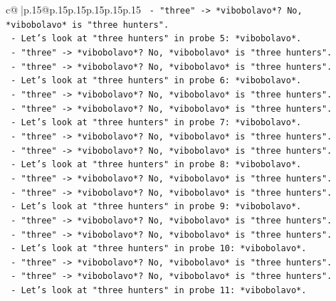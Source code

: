 \documentclass{article}
\begin{document}
{\begin{supertabular}{c@{$\;$}|p{.15\linewidth}@{}p{.15\linewidth}p{.15\linewidth}p{.15\linewidth}p{.15\linewidth}p{.15\linewidth}}
{{{\texttt{                  {-} "three" {-}> *vibobolavo*? No, *vibobolavo* is "three hunters".} \\
\texttt{                  {-} Let's look at "three hunters" in probe 5: *vibobolavo*.} \\
\texttt{                  {-} "three" {-}> *vibobolavo*? No, *vibobolavo* is "three hunters".} \\
\texttt{                  {-} "three" {-}> *vibobolavo*? No, *vibobolavo* is "three hunters".} \\
\texttt{                  {-} Let's look at "three hunters" in probe 6: *vibobolavo*.} \\
\texttt{                  {-} "three" {-}> *vibobolavo*? No, *vibobolavo* is "three hunters".} \\
\texttt{                  {-} "three" {-}> *vibobolavo*? No, *vibobolavo* is "three hunters".} \\
\texttt{                  {-} Let's look at "three hunters" in probe 7: *vibobolavo*.} \\
\texttt{                  {-} "three" {-}> *vibobolavo*? No, *vibobolavo* is "three hunters".} \\
\texttt{                  {-} "three" {-}> *vibobolavo*? No, *vibobolavo* is "three hunters".} \\
\texttt{                  {-} Let's look at "three hunters" in probe 8: *vibobolavo*.} \\
\texttt{                  {-} "three" {-}> *vibobolavo*? No, *vibobolavo* is "three hunters".} \\
\texttt{                  {-} "three" {-}> *vibobolavo*? No, *vibobolavo* is "three hunters".} \\
\texttt{                  {-} Let's look at "three hunters" in probe 9: *vibobolavo*.} \\
\texttt{                  {-} "three" {-}> *vibobolavo*? No, *vibobolavo* is "three hunters".} \\
\texttt{                  {-} "three" {-}> *vibobolavo*? No, *vibobolavo* is "three hunters".} \\
\texttt{                  {-} Let's look at "three hunters" in probe 10: *vibobolavo*.} \\
\texttt{                  {-} "three" {-}> *vibobolavo*? No, *vibobolavo* is "three hunters".} \\
\texttt{                  {-} "three" {-}> *vibobolavo*? No, *vibobolavo* is "three hunters".} \\
\texttt{                  {-} Let's look at "three hunters" in probe 11: *vibobolavo*.} \\
}}}
\end{supertabular}}
\end{document}
